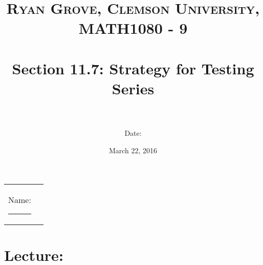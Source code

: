 \documentclass[paper=a4, fontsize=11pt]{scrartcl} %
\title{	
\normalfont \normalsize 
\textsc{Ryan Grove, Clemson University, MATH1080 - 9} \\ [25pt] %
\horrule{0.5pt} \\[0.4cm] %
\huge Section 11.7: Strategy for Testing Series\\ %
\horrule{2pt} \\[0.5cm] %
}
\author{Date:} %
\date{\normalsize March 22, 2016} %
\numberwithin{equation}{section} %
\numberwithin{figure}{section} %
\numberwithin{table}{section} %
\begin{document}
\maketitle %

\begin{flushleft}
\begin{tabular}{l l}
Name: \rule{3.2in}{.01cm}  & {}%
\end{tabular}
\end{flushleft}


\section*{\textbf{Lecture:}}
\end{document}
